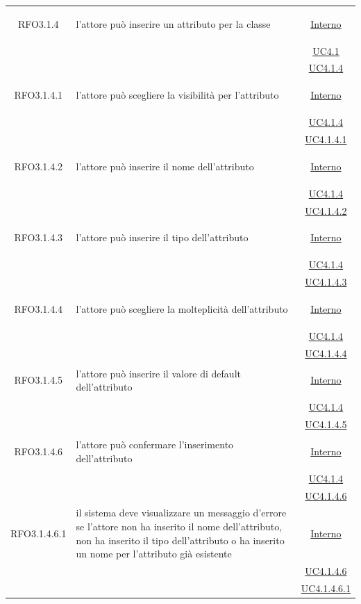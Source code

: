 \begin{longtable}{|c|>{\centering}m{7cm}|c|}
\hypertarget{RFO3.1.4}{RFO3.1.4} & l'attore può inserire un attributo per la classe & \hyperlink{Interno}{Interno}\\
& &\hyperref[UC4.1]{UC4.1}\\
& &\hyperref[UC4.1.4]{UC4.1.4}\\ \hline

\hypertarget{RFO3.1.4.1}{RFO3.1.4.1} & l'attore può scegliere la visibilità per l'attributo &  \hyperlink{Interno}{Interno}\\
& &\hyperref[UC4.1.4]{UC4.1.4}\\
& &\hyperref[UC4.1.4.1]{UC4.1.4.1}\\ \hline

\hypertarget{RFO3.1.4.2}{RFO3.1.4.2} & l'attore può inserire il nome dell'attributo & \hyperlink{Interno}{Interno}\\
& &\hyperref[UC4.1.4]{UC4.1.4}\\
& &\hyperref[UC4.1.4.2]{UC4.1.4.2}\\ \hline

\hypertarget{RFO3.1.4.3}{RFO3.1.4.3} & l'attore può inserire il tipo dell'attributo & \hyperlink{Interno}{Interno}\\
& &\hyperref[UC4.1.4]{UC4.1.4}\\
& &\hyperref[UC4.1.4.3]{UC4.1.4.3}\\ \hline

\hypertarget{RFO3.1.4.4}{RFO3.1.4.4} & l'attore può scegliere la molteplicità dell'attributo & \hyperlink{Interno}{Interno}\\
& &\hyperref[UC4.1.4]{UC4.1.4}\\
& &\hyperref[UC4.1.4.4]{UC4.1.4.4}\\ \hline

\hypertarget{RFO3.1.4.5}{RFO3.1.4.5} & l'attore può inserire il valore di default dell'attributo & \hyperlink{Interno}{Interno}\\
& &\hyperref[UC4.1.4]{UC4.1.4}\\
& &\hyperref[UC4.1.4.5]{UC4.1.4.5}\\ \hline

\hypertarget{RFO3.1.4.6}{RFO3.1.4.6} & l'attore può confermare l'inserimento dell'attributo & \hyperlink{Interno}{Interno}\\
& &\hyperref[UC4.1.4]{UC4.1.4}\\
& &\hyperref[UC4.1.4.6]{UC4.1.4.6}\\ \hline

\hypertarget{RFO3.1.4.6.1}{RFO3.1.4.6.1} & il sistema deve visualizzare un messaggio d'errore se l'attore non ha inserito il nome dell'attributo, non ha inserito il tipo dell'attributo o ha inserito un nome per l'attributo già esistente & \hyperlink{Interno}{Interno}\\
& &\hyperref[UC4.1.4.6]{UC4.1.4.6}\\
& &\hyperref[UC4.1.4.6.1]{UC4.1.4.6.1}\\ \hline


\end{longtable}
